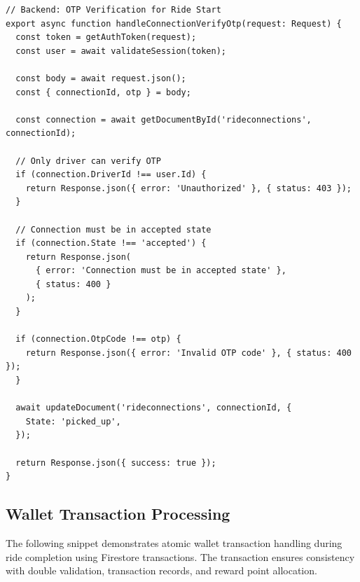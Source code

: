 \documentclass[10pt,a4paper]{report}
\begin{document}
\begin{verbatim}
// Backend: OTP Verification for Ride Start
export async function handleConnectionVerifyOtp(request: Request) {
  const token = getAuthToken(request);
  const user = await validateSession(token);
  
  const body = await request.json();
  const { connectionId, otp } = body;

  const connection = await getDocumentById('rideconnections', connectionId);
  
  // Only driver can verify OTP
  if (connection.DriverId !== user.Id) {
    return Response.json({ error: 'Unauthorized' }, { status: 403 });
  }

  // Connection must be in accepted state
  if (connection.State !== 'accepted') {
    return Response.json(
      { error: 'Connection must be in accepted state' },
      { status: 400 }
    );
  }

  if (connection.OtpCode !== otp) {
    return Response.json({ error: 'Invalid OTP code' }, { status: 400 });
  }

  await updateDocument('rideconnections', connectionId, {
    State: 'picked_up',
  });

  return Response.json({ success: true });
}
\end{verbatim}

\subsection{Wallet Transaction Processing}

\justify\large The following snippet demonstrates atomic wallet transaction handling during ride completion using Firestore transactions. The transaction ensures consistency with double validation, transaction records, and reward point allocation.
\end{document}
